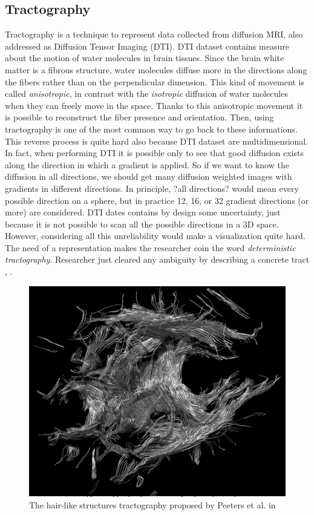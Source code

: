 \documentclass{article}
\begin{document}
\begin{multicols}{2}
\subsection{Tractography}
Tractography is a technique to represent data collected from diffusion MRI, also addressed as Diffusion Tensor Imaging (DTI). DTI dataset contains measure about the motion of water molecules in brain tissues. Since the brain white matter is a fibrous structure, water molecules diffuse more in the directions along the fibers rather than on the perpendicular dimension. This kind of movement is called \textit{anisotropic}, in contrast with the \textit{isotropic} diffusion of water molecules when they can freely move in the space. Thanks to this anisotropic movement it is possible to reconstruct the fiber presence and orientation. Then, using tractography is one of the most common way to go back to these informations. This reverse process is quite hard also because DTI dataset are multidimensional. In fact, when performing DTI it is possible only to see that good diffusion exists along the direction in which a gradient is applied. So if we want to know the diffusion in all directions, we should get many diffusion weighted images with gradients in different directions. In principle, ?all directions? would mean every possible direction on a sphere, but in practice 12, 16, or 32 gradient directions (or more) are considered. DTI dates contains by design some uncertainty, just because it is not possible to scan all the possible directions in a 3D space. However, considering all this unreliability would make a visualization quite hard. The need of a representation makes the researcher coin the word \textit{deterministic tractography}. Researcher just cleared any ambiguity by describing a concrete tract \cite{conturo1999tracking}, \cite{mori1999three}. 

\begin{figure}[H]
\centering
\includegraphics[width = 0.9\columnwidth]{hairLike}
\caption{The hair-like structures tractography proposed by Peeters et al. in \cite{peeters2006visualization}}
\label{fig:weightedGraph}
\end{figure}


\end{multicols}
\end{document}
